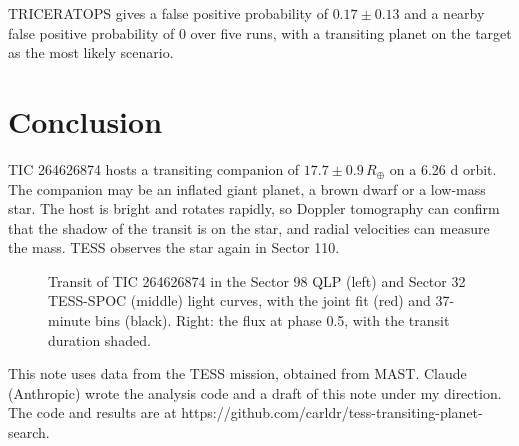 \documentclass{aastex701}
\begin{document}
TRICERATOPS \citep{giacalone2021} gives a false positive probability of $0.17 \pm 0.13$ and a nearby false positive
probability of 0 over five runs, with a transiting planet on the target as the most likely scenario.

\section{Conclusion}

TIC 264626874 hosts a transiting companion of $17.7 \pm 0.9\,R_\oplus$ on a 6.26 d orbit. The companion may be an
inflated giant planet, a brown dwarf or a low-mass star. The host is bright and rotates rapidly, so Doppler
tomography can confirm that the shadow of the transit is on the star, and radial velocities can measure the mass.
TESS observes the star again in Sector 110.

\begin{figure}[ht!]
\caption{Transit of TIC 264626874 in the Sector 98 QLP (left) and Sector 32 TESS-SPOC (middle) light curves, with the
joint fit (red) and 37-minute bins (black). Right: the flux at phase 0.5, with the transit duration shaded.
\label{fig:transit}}
\end{figure}

\begin{acknowledgments}
This note uses data from the TESS mission, obtained from MAST. Claude (Anthropic) wrote the analysis code and a draft of
this note under my direction. The code and results are at https://github.com/carldr/tess-transiting-planet-search.
\end{acknowledgments}



{}

\end{document}
